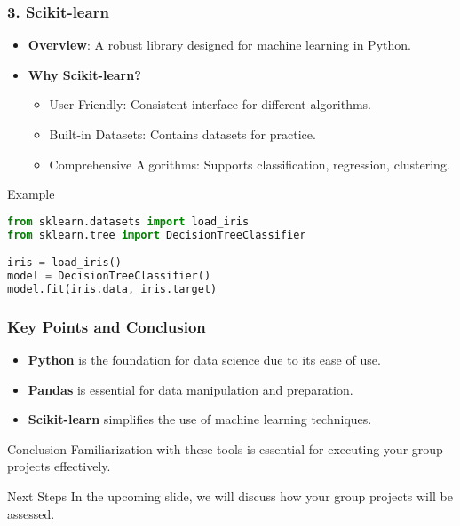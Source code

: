 \documentclass[aspectratio=169]{beamer}
\begin{document}
\begin{frame}
    \frametitle{3. Scikit-learn}
    \begin{itemize}
        \item \textbf{Overview}: A robust library designed for machine learning in Python.
        \item \textbf{Why Scikit-learn?}
        \begin{itemize}
            \item User-Friendly: Consistent interface for different algorithms.
            \item Built-in Datasets: Contains datasets for practice.
            \item Comprehensive Algorithms: Supports classification, regression, clustering.
        \end{itemize}
    \end{itemize}
    
    \begin{block}{Example}
        \begin{lstlisting}[language=Python]
from sklearn.datasets import load_iris
from sklearn.tree import DecisionTreeClassifier

iris = load_iris()
model = DecisionTreeClassifier()
model.fit(iris.data, iris.target)
        \end{lstlisting}
    \end{block}
\end{frame}

\begin{frame}
    \frametitle{Key Points and Conclusion}
    \begin{itemize}
        \item \textbf{Python} is the foundation for data science due to its ease of use.
        \item \textbf{Pandas} is essential for data manipulation and preparation.
        \item \textbf{Scikit-learn} simplifies the use of machine learning techniques.
    \end{itemize}
    
    \begin{block}{Conclusion}
        Familiarization with these tools is essential for executing your group projects effectively.
    \end{block}
    
    \begin{block}{Next Steps}
        In the upcoming slide, we will discuss how your group projects will be assessed.
    \end{block}
\end{frame}
\end{document}
